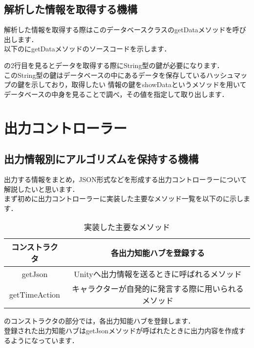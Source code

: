 \subsection{解析した情報を取得する機構}
解析した情報を取得する際はこのデータベースクラスのgetDataメソッドを呼び出します．
\\
以下のにgetDataメソッドのソースコードを示します．

の2行目を見るとデータを取得する際にString型の鍵が必要になります．
\\
このString型の鍵はデータベースの中にあるデータを保存しているハッシュマップの鍵を示しており，取得したい
情報の鍵をshowDataというメソッドを用いてデータベースの中身を見ることで調べ，その値を指定して取り出します．




\section{出力コントローラー}
\subsection{出力情報別にアルゴリズムを保持する機構}
出力する情報をまとめ，JSON形式などを形成する出力コントローラーについて解説したいと思います．\\
まず初めに出力コントローラーに実装した主要なメソッド一覧を以下のに示します．\\

\begin{table}[tbh]
	\caption{実装した主要なメソッド} \label{tab:OutputController}
	\begin{center}
		\begin{tabular}[htb]{c|c}
		\hline
		コンストラクタ & 各出力知能ハブを登録する \\
		\hline
		getJson & Unityへ出力情報を送るときに呼ばれるメソッド \\
		\hline
		getTimeAction & キャラクターが自発的に発言する際に用いられるメソッド \\
		\hline
		\end{tabular}
	\end{center}
\end{table}

のコンストラクタの部分では，各出力知能ハブを登録します．\\
登録された出力知能ハブはgetJsonメソッドが呼ばれたときに出力内容を作成するようになっています．\\

